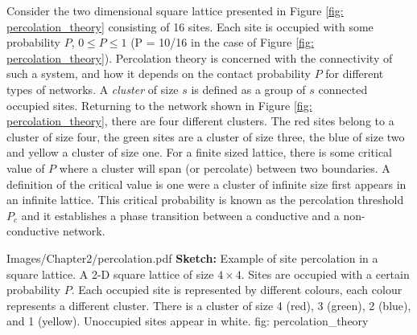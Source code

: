 Consider the two dimensional square lattice presented in Figure \ref{fig: percolation_theory} consisting of 16 sites. Each site is occupied with some probability $P$, $0\leq P \leq1$ (P = 10/16 in the case of Figure \ref{fig: percolation_theory}). Percolation theory is concerned with the connectivity of such a system, and how it depends on the contact probability $P$ for different types of networks. A \textit{cluster} of size $s$ is defined as a group of $s$ connected occupied sites. Returning to the network shown in Figure \ref{fig: percolation_theory}, there are four different clusters. The red sites belong to a cluster of size four, the green sites are a cluster of size three, the blue of size two and yellow a cluster of size one. For a finite sized lattice, there is some critical value of $P$ where a cluster will span (or percolate) between two boundaries. A definition of the critical value is one were a cluster of infinite size first appears in an infinite lattice\cite{christensen2002}. This critical probability is known as the percolation threshold $P_c$ and it establishes a phase transition between a conductive and a non-conductive network.

{Images/Chapter2/percolation.pdf}
{\textbf{Sketch:} Example of site percolation in a square lattice.}
{A 2-D square lattice of size $4\times 4$. Sites are occupied with a certain probability $P$. Each occupied site is represented by different colours, each colour represents a different cluster. There is a cluster of size 4 (red), 3 (green), 2 (blue), and 1 (yellow). Unoccupied sites appear in white.}
{fig: percolation_theory}

